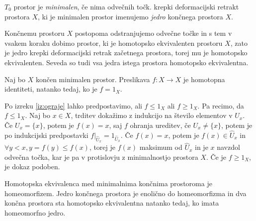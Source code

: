 \documentclass[mat1]{fmfdelo}
\begin{document}
\begin{definicija}
    $T_0$ prostor je \textit{minimalen}, če nima odvečnih točk. krepki deformacijski retrakt prostora $X$, ki je minimalen prostor imenujemo \textit{jedro} končnega prostora $X$.
\end{definicija}

Končnemu prostoru $X$ postopoma odstranjujemo odvečne točke in s tem v vsakem koraku dobimo prostor, ki je homotopsko ekvivalenten prostoru $X$, zato je jedro krepki deformacijski retrak začetnega prostora, torej mu je homotopsko ekvivalenten. Seveda so tudi vsa jedra istega prostora homotopsko ekvivalentna.

\begin{izrek}
    \label{iz:identiteta}
    Naj bo $X$ končen minimalen prostor. Preslikava $f:X\rightarrow X$ je homotopna identiteti, natanko tedaj, ko je $f=1_X$.
\end{izrek}

\begin{dokaz}
    Po izreku \ref{iz:ograje} lahko predpostavimo, ali 
    $f\leq 1_X$ ali $f\geq 1_X$. %
    Pa recimo, da $f\leq 1_X$. 
    Naj bo $x\in X$, trditev dokažimo z indukcijo na 
    število elementov v $U_x$. Če $U_x=\{x\}$, potem je 
    $f(x)=x$, saj $f$ ohranja ureditev, če $U_x\neq\{x\}$, potem 
    je po indukcijski predpostavki 
    $f|_{\hat{U}_x}=1_{\hat{U}_x}$. Če $f(x)=x$, potem je 
    $f(x)\in \hat{U}_x$ in $\forall y < x, y=f(y)\leq 
    f(x)$, torej je $f(x)$ maksimum od $\hat{U}_x$ in je 
    $x$ navzdol odvečna točka, kar je pa v protislovju 
    z minimalnostjo prostora $X$. Če je $f\geq 1_X$, je 
    dokaz podoben.
\end{dokaz}

\begin{posledica}
    Homotopska ekvivalenca med minimalnima končnima prostoroma je homeomorfizem. Jedro končnega prostora je enolično do homeomorfizma in dva končna prostora sta homotopsko ekvivalentna natanko tedaj, ko imata homeomorfno jedro.
\end{posledica}
\end{document}
